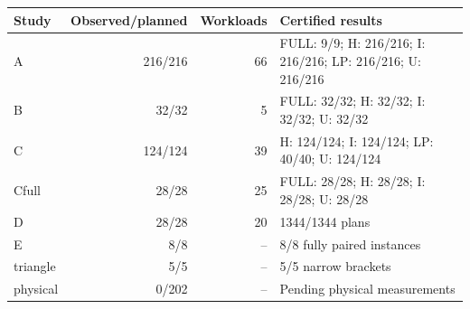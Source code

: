 \begin{tabular}{lrrl}
\hline
Study & Observed/planned & Workloads & Certified results \\
\hline
A & 216/216 & 66 & FULL: 9/9; H: 216/216; I: 216/216; LP: 216/216; U: 216/216 \\
B & 32/32 & 5 & FULL: 32/32; H: 32/32; I: 32/32; U: 32/32 \\
C & 124/124 & 39 & H: 124/124; I: 124/124; LP: 40/40; U: 124/124 \\
Cfull & 28/28 & 25 & FULL: 28/28; H: 28/28; I: 28/28; U: 28/28 \\
D & 28/28 & 20 & 1344/1344 plans \\
E & 8/8 & -- & 8/8 fully paired instances \\
triangle & 5/5 & -- & 5/5 narrow brackets \\
physical & 0/202 & -- & Pending physical measurements \\
\hline
\end{tabular}
